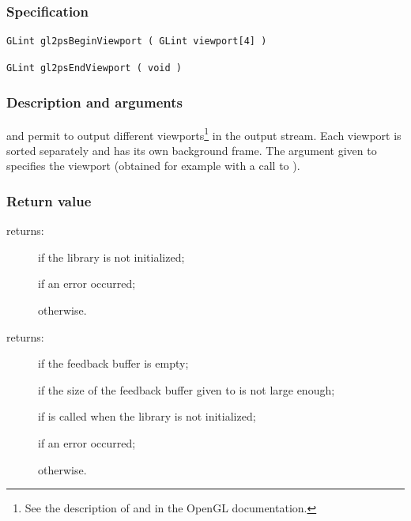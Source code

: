 \subsubsection{Specification}

\begin{verbatim}
GLint gl2psBeginViewport ( GLint viewport[4] )
\end{verbatim}

\begin{verbatim}
GLint gl2psEndViewport ( void )
\end{verbatim}

\subsubsection{Description and arguments}

 and  permit to output different
viewports\footnote{See the description of  and 
in the OpenGL documentation.} in the output stream. Each viewport is sorted
separately and has its own background frame. The argument given to
 specifies the viewport (obtained for example with a
call to ).

\subsubsection{Return value}

\noindent{} returns:
\begin{description}
\item[] if the library is not initialized;
\item[] if an error occurred;
\item[] otherwise.
\end{description}

\noindent{} returns:
\begin{description}
\item[] if the feedback buffer is empty;
\item[] if the size of the feedback buffer given to
   is not large enough;
\item[] if  is called when the
  library is not initialized;
\item[] if an error occurred;
\item[] otherwise.
\end{description}


